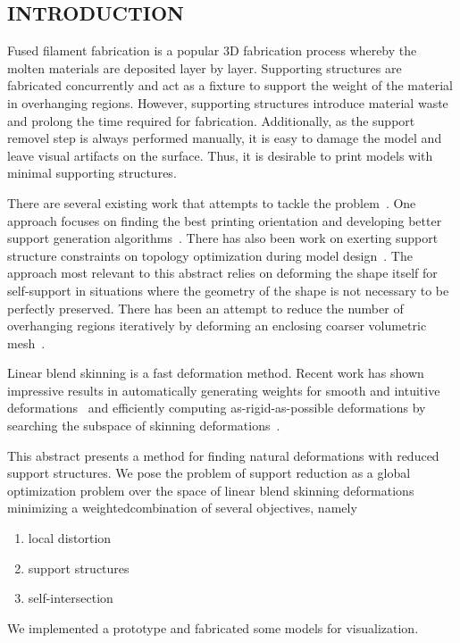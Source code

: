 
\subsection*{INTRODUCTION}

Fused filament fabrication is a popular 3D fabrication process whereby the molten materials are deposited layer by layer. Supporting structures are fabricated concurrently and act as a fixture to support the weight of the material in overhanging regions. However, supporting structures introduce material waste and prolong the time required for fabrication. Additionally, as the support removel step is always performed manually, it is easy to damage the model and leave visual artifacts on the surface. Thus, it is desirable to print models with minimal supporting structures.

There are several existing work that attempts to tackle the problem~\cite{jiang_xu_stringer_2018}. One approach focuses on finding the best printing orientation and developing better support generation algorithms~\cite{vanek_galicia_benes_2014}. There has also been work on exerting support structure constraints on topology optimization during model design~\cite{langelaar_2016}. The approach most relevant to this abstract relies on deforming the shape itself for self-support in situations where the geometry of the shape is not necessary to be perfectly preserved. There has been an attempt to reduce the number of overhanging regions iteratively by deforming an enclosing coarser volumetric mesh~\cite{hu_jin_wang_2015}.

Linear blend skinning is a fast deformation method. Recent work has shown impressive results in automatically generating weights for smooth and intuitive deformations~\cite{jacobson_bounded_biharmonic_weights_2011} and efficiently computing as-rigid-as-possible deformations by searching the subspace of skinning deformations~\cite{jacobson_fast_2012}.

This abstract presents a method for finding natural deformations with reduced support structures. We pose the problem of support reduction as a global optimization problem over the space of linear blend skinning deformations minimizing a weightedcombination of several objectives, namely
\begin{enumerate}
    \item local distortion ~\cite{sorkine_arap_2007}
    \item support structures
    \item self-intersection
\end{enumerate}
We implemented a prototype and fabricated some models for visualization.

